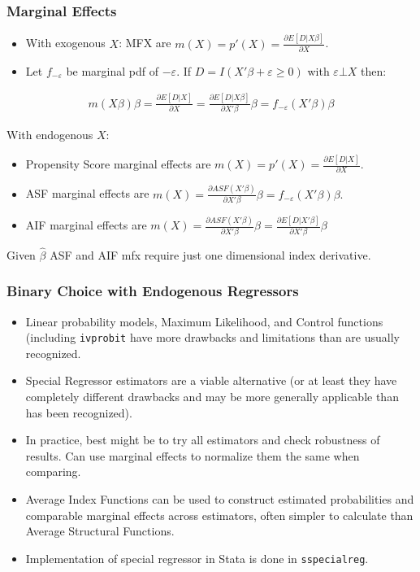 \documentclass[11pt,dvipsnames,table,aspectratio=169]{beamer}
\begin{document}
\begin{frame}
\frametitle{ Marginal Effects}
\begin{itemize}
\item With exogenous $X$: MFX are $m(X) = p'(X) =  \frac{\partial E[D | X \beta]}{\partial X}$.
\item Let $f_{-\varepsilon}$ be marginal pdf of $-\varepsilon$. If $D=I(X' \beta + \varepsilon \geq 0)$ with $\varepsilon \bot X$ then:
\end{itemize}
\begin{eqnarray*}
m (X \beta) \beta= \frac{\partial E[D | X]}{\partial X}  = \frac{\partial E[D | X \beta]}{\partial X' \beta}  \beta  = f_{-\varepsilon}(X' \beta) \beta
\end{eqnarray*}

With endogenous $X$:
\begin{itemize}
\item Propensity Score marginal effects are $m(X) = p'(X) =  \frac{\partial E[D | X]}{\partial X}$.
\item ASF marginal effects are $m(X) =\frac{\partial ASF(X'\beta)}{\partial X'\beta} \beta = f_{-\varepsilon}(X' \beta) \beta.$
\item AIF marginal effects are $m(X) =\frac{\partial ASF(X'\beta)}{\partial X'\beta} \beta = \frac{\partial E[D | X' \beta ]}{\partial X' \beta} \beta$
\end{itemize}
Given $\hat{\beta}$ ASF and AIF mfx require just one dimensional index derivative.
\end{frame}

\begin{frame}
\frametitle{Binary Choice with Endogenous Regressors}
\begin{itemize}
\item Linear probability models, Maximum Likelihood, and Control functions (including \texttt{ivprobit} have more drawbacks and limitations than are usually recognized.
\item Special Regressor estimators are a viable alternative (or at least they have completely different drawbacks and may be more generally applicable than has been recognized).
\item In practice, best might be to try all estimators and check robustness of results. Can use marginal effects to normalize them the same when comparing.
\item Average Index Functions can be used to construct estimated probabilities and comparable marginal effects across estimators, often simpler to calculate than Average Structural Functions.
\item Implementation of special regressor in Stata is done in \texttt{sspecialreg}.
\end{itemize}
\end{frame}
\end{document}

